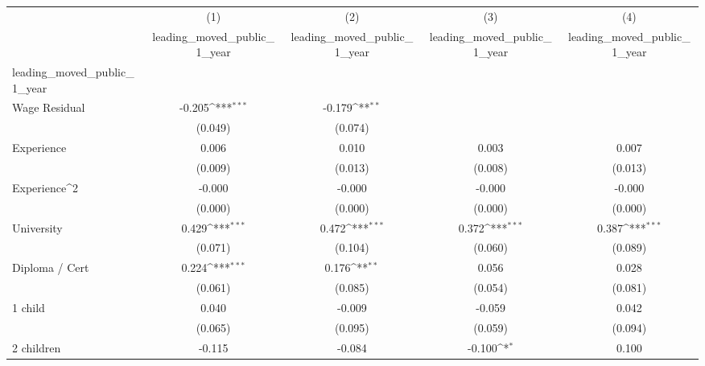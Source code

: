 {
\def\sym#1{\ifmmode^{#1}\else\(^{#1}\)\fi}
\begin{tabular}{l*{4}{c}}
\hline\hline
                    &\multicolumn{1}{c}{(1)}&\multicolumn{1}{c}{(2)}&\multicolumn{1}{c}{(3)}&\multicolumn{1}{c}{(4)}\\
                    &\multicolumn{1}{c}{leading\_moved\_public\_1\_year}&\multicolumn{1}{c}{leading\_moved\_public\_1\_year}&\multicolumn{1}{c}{leading\_moved\_public\_1\_year}&\multicolumn{1}{c}{leading\_moved\_public\_1\_year}\\
\hline
leading\_moved\_public\_1\_year&                     &                     &                     &                     \\
Wage Residual       &      -0.205\sym{***}&      -0.179\sym{**} &                     &                     \\
                    &     (0.049)         &     (0.074)         &                     &                     \\
Experience          &       0.006         &       0.010         &       0.003         &       0.007         \\
                    &     (0.009)         &     (0.013)         &     (0.008)         &     (0.013)         \\
Experience^{2}      &      -0.000         &      -0.000         &      -0.000         &      -0.000         \\
                    &     (0.000)         &     (0.000)         &     (0.000)         &     (0.000)         \\
University          &       0.429\sym{***}&       0.472\sym{***}&       0.372\sym{***}&       0.387\sym{***}\\
                    &     (0.071)         &     (0.104)         &     (0.060)         &     (0.089)         \\
Diploma / Cert      &       0.224\sym{***}&       0.176\sym{**} &       0.056         &       0.028         \\
                    &     (0.061)         &     (0.085)         &     (0.054)         &     (0.081)         \\
1 child             &       0.040         &      -0.009         &      -0.059         &       0.042         \\
                    &     (0.065)         &     (0.095)         &     (0.059)         &     (0.094)         \\
2 children          &      -0.115         &      -0.084         &      -0.100\sym{*}  &       0.100         \\

\end{tabular}}
